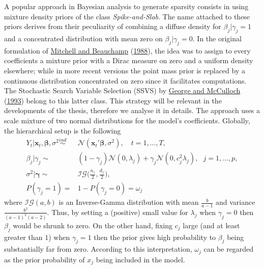 \documentclass[
  12pt,
]{book}
\theoremstyle{break}
\theoremstyle{nonumberplain}
\begin{document}
A popular approach in Bayesian analysis to generate sparsity consists in
using mixture density priors of the class \emph{Spike-and-Slab}. The
name attached to these priors derives from their peculiarity of
combining a diffuse density for \(\beta_{j}|\gamma_{j}=1\) and a
concentrated distribution with mean zero on \(\beta_{j}|\gamma_{j}=0\).
In the original formulation of \protect\hyperlink{ref-MB_1988}{Mitchell
and Beauchamp} (\protect\hyperlink{ref-MB_1988}{1988}), the idea was to
assign to every coefficients a mixture prior with a Dirac measure on
zero and a uniform density elsewhere; while in more recent versions the
point mass prior is replaced by a continuous distribution concentrated
on zero since it facilitates computations. The Stochastic Search
Variable Selection (SSVS) by \protect\hyperlink{ref-GM_1993}{George and
McCulloch} (\protect\hyperlink{ref-GM_1993}{1993}) belong to this latter
class. This strategy will be relevant in the developments of the thesis,
therefore we analyse it in details. The approach uses a scale mixture of
two normal distributions for the model's coefficients. Globally, the
hierarchical setup is the following \begin{align}
Y_{t}|\boldsymbol{x}_{t},\boldsymbol{\beta},\sigma^{2} \overset{ind}{\sim} & \mathcal{N}(\boldsymbol{x}_{t}'\boldsymbol{\beta},\sigma^{2}), \quad t=1,...,T, \nonumber \\
\beta_{j}|\gamma_{j}\sim &  (1-\gamma_{j})\mathcal{N}(0,\lambda_{j})+\gamma_{j}\mathcal{N}(0,c_{j}^{2}\lambda_{j}), \ \ \ j=1,...,p,\label{eq:eq2ssvs} \\ 
\sigma^{2}|\boldsymbol{\gamma}\sim &  \mathcal{IG}\bigg(\frac{n_{\gamma}}{2},\frac{d_{\gamma}}{2}\bigg), \label{eq:ssvs2.3}    \\
P(\gamma_{j}=1)= & 1-P(\gamma_{j}=0)=\omega_{j} \label{eq:ssvs3}
\end{align} where \(\mathcal{IG}(a,b)\) is an Inverse-Gamma distribution
with mean \(\frac{b}{a-1}\) and variance
\(\frac{b^{2}}{(a-1)^{2}(a-2)}\). Thus, by setting a (positive) small
value for \(\lambda_{j}\) when \(\gamma_{j}=0\) then \(\beta_{j}\) would
be shrunk to zero. On the other hand, fixing \(c_{j}\) large (and at
least greater than \(1\)) when \(\gamma_{j}=1\) then the prior gives
high probability to \(\beta_{j}\) being substantially far from zero.
According to this interpretation, \(\omega_{j}\) can be regarded as the
prior probability of \(x_{j}\) being included in the model.
\end{document}
